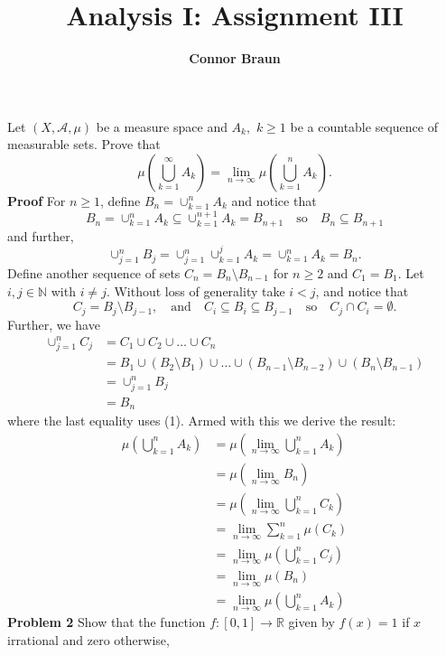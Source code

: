 \documentclass[11pt, letterpaper]{article}
\title{\bf Analysis I: Assignment III}
\author{\bf Connor Braun}
\date{}
\newcommand{\mbb}[1]{\mathbb{#1}}
\newcommand{\mc}[1]{\mathcal{#1}}
\begin{document}
    \maketitle
     Let $(X,\mc{A},\mu)$ be a measure space and $A_k,$ $k\geq 1$ be a countable sequence of measurable sets.
    Prove that
    \[\mu\left(\bigcup_{k=1}^\infty A_k\right)=\lim_{n\rightarrow\infty}\mu\left(\bigcup_{k=1}^nA_k\right).\]
    {\bf Proof} For $n\geq 1$, define $B_n=\cup_{k=1}^nA_k$ and notice that 
    \[B_n=\cup_{k=1}^nA_k\subseteq\cup_{k=1}^{n+1}A_k=B_{n+1}\quad\text{so}\quad B_n\subseteq B_{n+1}\]
    and further,
    \[\cup_{j=1}^n B_j=\cup_{j=1}^n\cup_{k=1}^j A_k=\cup_{k=1}^n A_k=B_n.\tag{1}\]
    Define another sequence of sets $C_n=B_n\setminus B_{n-1}$ for $n\geq 2$ and $C_1=B_1$. Let $i,j\in\mbb{N}$ with $i\neq j$. Without
    loss of generality take $i<j$, and notice that
    \[C_j=B_j\setminus B_{j-1},\quad\text{and}\quad C_i\subseteq B_i\subseteq B_{j-1}\quad\text{so}\quad C_j\cap C_i=\emptyset.\]
    Further, we have
    \begin{align*}
        \cup_{j=1}^nC_j&=C_1\cup C_2\cup\dots\cup C_n\\
        &=B_1\cup(B_2\setminus B_1)\cup\dots\cup(B_{n-1}\setminus B_{n-2})\cup(B_n\setminus B_{n-1})\\
        &=\cup_{j=1}^nB_j\\
        &=B_n\tag{2}
    \end{align*}
    where the last equality uses (1). Armed with this we derive the result:
    \begin{align*}
        \mu\left(\bigcup_{k=1}^n A_k\right)&=\mu\left(\lim_{n\rightarrow\infty}\bigcup_{k=1}^nA_k\right)\\
        &=\mu\left(\lim_{n\rightarrow\infty}B_n\right)\\
        &=\mu\left(\lim_{n\rightarrow\infty}\bigcup_{k=1}^nC_k\right)\tag{by (2)}\\
        &=\lim_{n\rightarrow\infty}\sum_{k=1}^n\mu(C_k)\tag{countable additivity}\\
        &=\lim_{n\rightarrow\infty}\mu\left(\bigcup_{k=1}^n C_j\right)\tag{finite additivity}\\
        &=\lim_{n\rightarrow\infty}\mu\left(B_n\right)\tag{by (2)}\\
        &=\lim_{n\rightarrow\infty}\mu\left(\bigcup_{k=1}^nA_k\right)\tag*{$\qed$}
    \end{align*}
    {\bf Problem 2} Show that the function $f:[0,1]\rightarrow\mbb{R}$ given by $f(x)=1$ if $x$ irrational and zero otherwise,
\end{document}
